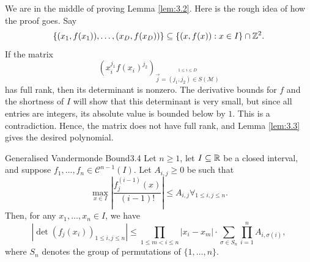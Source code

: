 \documentclass{Vorlesungstemplate_English} %
\begin{document}
\noindent We are in the middle of proving Lemma \ref{lem:3.2}. Here is the rough idea of how the proof goes. Say
\[ \{ (x_1,f(x_1)), \dots, (x_D,f(x_D))\} \subseteq \{ (x,f(x)): x \in I\}\cap \mathbb{Z}^2.\]
If the matrix
\[ \left(x_i^{j_1}f(x_i)^{j_2}\right)_{\stackrel{1 \leq i \leq D}{\vec j=(j_1,j_2) \in S(\mathcal{M})}}\]
has full rank, then its determinant is nonzero. The derivative bounds for $f$ and the shortness of $I$ will show that this determinant is very small, but since all entries are integers, its absolute value is bounded below by $1$. This is a contradiction. Hence, the matrix does not have full rank, and Lemma \ref{lem:3.3} gives the desired polynomial.

\begin{lemma}{Generalised Vandermonde Bound}{3.4}
  Let $n \geq 1$, let $I \subseteq \mathbb{R}$ be a closed interval, and suppose $f_1, \dots, f_n \in \mathcal{C}^{n-1}(I)$. Let $A_{i,j} \geq 0$ be such that
  \[ \max_{x \in I}\left| \frac{f_j^{(i-1)}(x)}{(i-1)!}\right| \leq A_{i,j} \forall_{1 \leq i,j \leq n}.\]
  Then, for any $x_1, \dots, x_n \in I$, we have
  \[ \left|\det(f_j(x_i))_{1 \leq i,j \leq n}\right| \leq \prod_{1 \leq m < i \leq n}|x_i-x_m| \cdot \sum_{\sigma \in S_n}\prod_{i=1}^n A_{i,\sigma(i)},\]
  where $S_n$ denotes the group of permutations of $\{ 1, \dots, n\}$.
\end{lemma}
\end{document}
